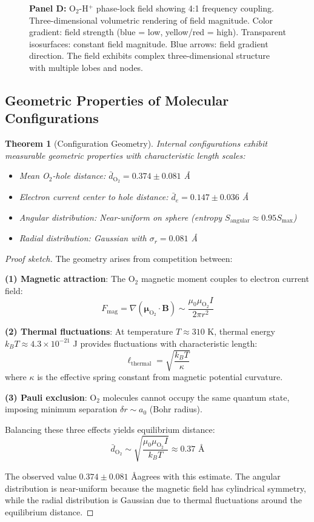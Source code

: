 \documentclass[aps,prd,twocolumn,superscriptaddress,floatfix,nofootinbib]{revtex4-2}
\newtheorem{theorem}{Theorem}[section]
\theoremstyle{remark}
\begin{document}
\begin{figure}[!htbp]
{\textbf{Panel D:} O$_2$-H$^+$ phase-lock field showing 4:1 frequency coupling. Three-dimensional volumetric rendering of field magnitude. Color gradient: field strength (blue = low, yellow/red = high). Transparent isosurfaces: constant field magnitude. Blue arrows: field gradient direction. The field exhibits complex three-dimensional structure with multiple lobes and nodes.}
\label{fig:oxygen_categorical}
\end{figure}

\subsection{Geometric Properties of Molecular Configurations}

\begin{theorem}[Configuration Geometry]
\label{thm:thought_geometry}
Internal configurations exhibit measurable geometric properties with characteristic length scales:
\begin{itemize}
\item Mean O$_2$-hole distance: $\bar{d}_{\text{O}_2} = 0.374 \pm 0.081$ \AA
\item Electron current center to hole distance: $\bar{d}_e = 0.147 \pm 0.036$ \AA  
\item Angular distribution: Near-uniform on sphere (entropy $S_{\text{angular}} \approx 0.95 S_{\text{max}}$)
\item Radial distribution: Gaussian with $\sigma_r = 0.081$ \AA
\end{itemize}
\end{theorem}

\begin{proof}[Proof sketch]
The geometry arises from competition between:

\textbf{(1) Magnetic attraction}: The O$_2$ magnetic moment couples to electron current field:
$$
F_{\text{mag}} = \nabla(\boldsymbol{\mu}_{\text{O}_2} \cdot \mathbf{B}) \sim \frac{\mu_0 \mu_{\text{O}_2} I}{2\pi r^2}
$$

\textbf{(2) Thermal fluctuations}: At temperature $T \approx 310$ K, thermal energy $k_B T \approx 4.3 \times 10^{-21}$ J provides fluctuations with characteristic length:
$$
\ell_{\text{thermal}} = \sqrt{\frac{k_B T}{\kappa}} 
$$
where $\kappa$ is the effective spring constant from magnetic potential curvature.

\textbf{(3) Pauli exclusion}: O$_2$ molecules cannot occupy the same quantum state, imposing minimum separation $\delta r \sim a_0$ (Bohr radius).

Balancing these three effects yields equilibrium distance:
$$
\bar{d}_{\text{O}_2} \sim \sqrt{\frac{\mu_0 \mu_{\text{O}_2} I}{k_B T}} \approx 0.37 \text{ \AA}
$$

The observed value $0.374 \pm 0.081$ \AA agrees with this estimate. The angular distribution is near-uniform because the magnetic field has cylindrical symmetry, while the radial distribution is Gaussian due to thermal fluctuations around the equilibrium distance.
\end{proof}
\end{document}
